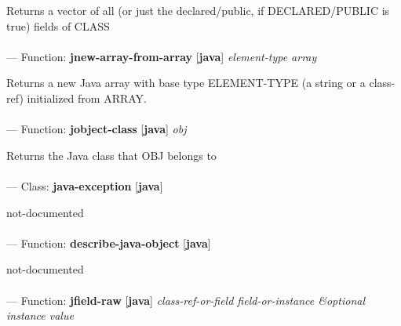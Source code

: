 \begin{adjustwidth}{5em}{5em}
Returns a vector of all (or just the declared/public, if DECLARED/PUBLIC is true) fields of CLASS
\end{adjustwidth}

\paragraph{}
\label{JAVA:JNEW-ARRAY-FROM-ARRAY}
--- Function: \textbf{jnew-array-from-array} [\textbf{java}] \textit{element-type array}

\begin{adjustwidth}{5em}{5em}
Returns a new Java array with base type ELEMENT-TYPE (a string or a class-ref)
   initialized from ARRAY.
\end{adjustwidth}

\paragraph{}
\label{JAVA:JOBJECT-CLASS}
--- Function: \textbf{jobject-class} [\textbf{java}] \textit{obj}

\begin{adjustwidth}{5em}{5em}
Returns the Java class that OBJ belongs to
\end{adjustwidth}

\paragraph{}
\label{JAVA:JAVA-EXCEPTION}
--- Class: \textbf{java-exception} [\textbf{java}] \textit{}

\begin{adjustwidth}{5em}{5em}
not-documented
\end{adjustwidth}

\paragraph{}
\label{JAVA:DESCRIBE-JAVA-OBJECT}
--- Function: \textbf{describe-java-object} [\textbf{java}] \textit{}

\begin{adjustwidth}{5em}{5em}
not-documented
\end{adjustwidth}

\paragraph{}
\label{JAVA:JFIELD-RAW}
--- Function: \textbf{jfield-raw} [\textbf{java}] \textit{class-ref-or-field field-or-instance \&optional instance value}

